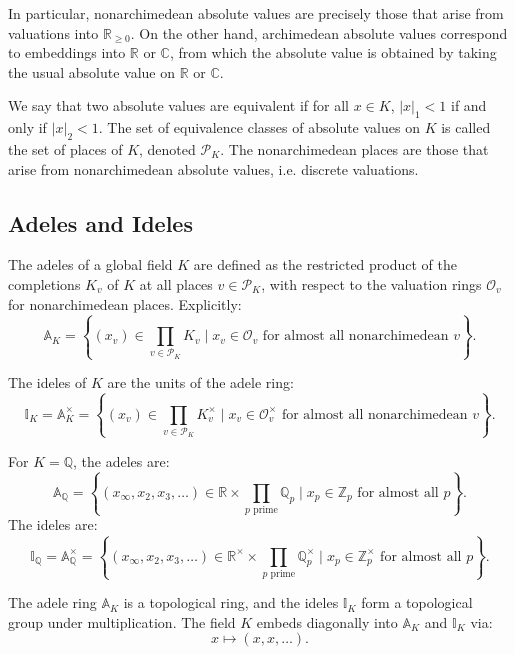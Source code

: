 \documentclass[12pt]{article}
\begin{document}
In particular, nonarchimedean absolute values are precisely those that arise from valuations into $\mathbb{R}_{\geq 0}$. On the other hand, archimedean absolute values correspond to embeddings into $\mathbb{R}$ or $\mathbb{C}$, from which the absolute value is obtained by taking the usual absolute value on $\mathbb{R}$ or $\mathbb{C}$.

We say that two absolute values are equivalent if for all $x \in K$, $|x|_1 < 1$ if and only if $|x|_2 < 1$. The set of equivalence classes of absolute values on $K$ is called the set of places of $K$, denoted $\mathcal{P}_K$. The nonarchimedean places are those that arise from nonarchimedean absolute values, i.e. discrete valuations. 

\subsection{Adeles and Ideles}
\begin{definition}
The adeles of a global field $K$ are defined as the restricted product of the completions $K_v$ of $K$ at all places $v \in \mathcal{P}_K$, with respect to the valuation rings $\mathcal{O}_v$ for nonarchimedean places. Explicitly:
\[
\mathbb{A}_K = \left\{ (x_v) \in \prod_{v \in \mathcal{P}_K} K_v \mid x_v \in \mathcal{O}_v \text{ for almost all nonarchimedean } v \right\}.
\]

The ideles of $K$ are the units of the adele ring:
\[
\mathbb{I}_K = \mathbb{A}_K^\times = \left\{ (x_v) \in \prod_{v \in \mathcal{P}_K} K_v^\times \mid x_v \in \mathcal{O}_v^\times \text{ for almost all nonarchimedean } v \right\}.
\]
\end{definition}
\begin{example}
For $K = \mathbb{Q}$, the adeles are:
\[
\mathbb{A}_\mathbb{Q} = \left\{ (x_\infty, x_2, x_3, \dots) \in \mathbb{R} \times \prod_{p \text{ prime}} \mathbb{Q}_p \mid x_p \in \mathbb{Z}_p \text{ for almost all } p \right\}.
\]
The ideles are:
\[
\mathbb{I}_\mathbb{Q} = \mathbb{A}_\mathbb{Q}^\times = \left\{ (x_\infty, x_2, x_3, \dots) \in \mathbb{R}^\times \times \prod_{p \text{ prime}} \mathbb{Q}_p^\times \mid x_p \in \mathbb{Z}_p^\times \text{ for almost all } p \right\}.
\]
\end{example}

The adele ring $\mathbb{A}_K$ is a topological ring, and the ideles $\mathbb{I}_K$ form a topological group under multiplication. The field $K$ embeds diagonally into $\mathbb{A}_K$ and $\mathbb{I}_K$ via:
\[
x \mapsto (x, x, \dots).
\]
\end{document}
